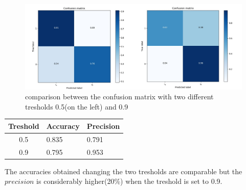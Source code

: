 \begin{figure}
\begin{center}
\includegraphics[width=1\linewidth]{images/cm.jpg}
\end{center}
   \caption{comparison between the confusion matrix with two different tresholds 0.5(on the left) and 0.9}
\label{fig:conf_matrices}
\end{figure}


\begin{table}[]
\centering
\begin{tabular}{|c|ll|}
\hline
Treshold & Accuracy & Precision \\ \hline
0.5                          & 0.835    & 0.791     \\ \hline
0.9                          & 0.795    & 0.953     \\ \hline
\end{tabular}
\end{table}


The accuracies obtained changing the two tresholds are comparable but the $precision$ is considerably higher(20\%) when the treshold is set to 0.9.



